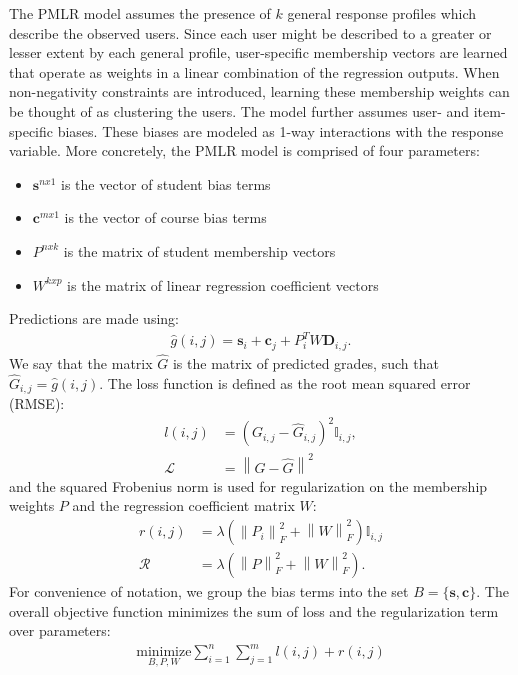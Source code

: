 \documentclass[10pt]{proc}
\newcommand{\norm}[1]{\left\lVert#1\right\rVert}
\begin{document}
The PMLR model assumes the presence of $k$ general response profiles which
describe the observed users. Since each user might be described to a greater or
lesser extent by each general profile, user-specific membership vectors are
learned that operate as weights in a linear combination of the regression
outputs. When non-negativity constraints are introduced, learning these
membership weights can be thought of as clustering the users. The model further
assumes user- and item-specific biases. These biases are modeled as 1-way
interactions with the response variable. More concretely, the PMLR model is
comprised of four parameters:
%
\begin{itemize}
    \item  $\bm{s}^{n x 1}$ is the vector of student bias terms
    \item  $\bm{c}^{m x 1}$ is the vector of course bias terms
    \item  $P^{n x k}$ is the matrix of student membership vectors
    \item  $W^{k x p}$ is the matrix of linear regression coefficient vectors
\end{itemize}
%
Predictions are made using:
%
\begin{align}
    \hat{g}(i,j) = \bm{s}_i + \bm{c}_j + P_i^T W \bm{D}_{i,j}.
\end{align}
%
We say that the matrix $\hat{G}$ is the matrix of predicted grades, such that
$\hat{G}_{i,j} = \hat{g}(i, j)$.
%
The loss function is defined as the root mean squared error (RMSE):
%
\begin{align}
    l(i,j) &= (G_{i,j} - \hat{G}_{i,j})^2 \mathbb{I}_{i,j},  \\
    \mathcal{L} &= \norm{G - \hat{G}}^2
\end{align}
%
and the squared Frobenius norm is used for regularization on the membership
weights $P$ and the regression coefficient matrix $W$:
%
\begin{align}
    r(i,j) &= \lambda (\norm{P_i}_F^2 + \norm{W}_F^2) \mathbb{I}_{i,j}  \\
    \mathcal{R} &= \lambda (\norm{P}_F^2 + \norm{W}_F^2).
\end{align}
%
For convenience of notation, we group the bias terms into the set $B = \{\bm{s},
\bm{c}\}$. The overall objective function minimizes the sum of loss and the
regularization term over parameters:
%
\begin{align}
    \underset{B, P, W}{\text{minimize}}
        \sum_{i=1}^n \sum_{j=1}^m l(i,j) + r(i,j)
\end{align}
\end{document}
